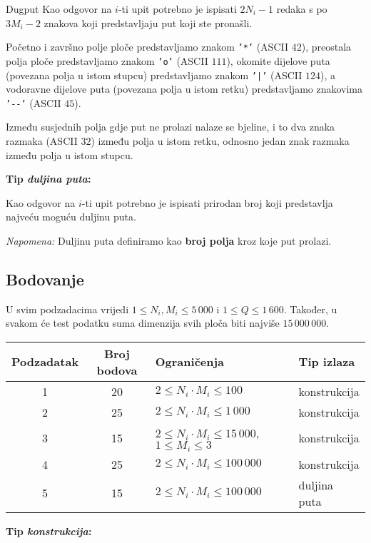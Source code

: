 \begin{statement}[
  problempoints=100,
  timelimit=5 sekundi,
  memorylimit=512 MiB,
]{Dugput}
Kao odgovor na $i$-ti upit potrebno je ispisati $2N_i-1$ redaka s po $3M_i-2$
znakova koji predstavljaju put koji ste pronašli.

Početno i završno polje ploče predstavljamo znakom \texttt{'*'} (ASCII $42$),
preostala polja ploče predstavljamo znakom \texttt{'o'} (ASCII $111$),
okomite dijelove puta (povezana polja u istom stupcu) predstavljamo znakom
\texttt{'|'} (ASCII $124$), a vodoravne dijelove puta (povezana polja u istom
retku) predstavljamo znakovima \texttt{'-{}-'} (ASCII $45$).

Između susjednih polja gdje put ne prolazi nalaze se bjeline, i to dva znaka
razmaka (ASCII $32$) između polja u istom retku, odnosno jedan znak razmaka
između polja u istom stupcu.

\textbf{Tip \textit{duljina puta}:}

Kao odgovor na $i$-ti upit potrebno je ispisati prirodan broj koji predstavlja
najveću moguću duljinu puta.

\textit{Napomena:} Duljinu puta definiramo kao \textbf{broj polja} kroz koje put prolazi.

\subsection*{Bodovanje}
U svim podzadacima vrijedi $1 \leq N_i, M_i \leq 5\,000$ i $1 \leq Q \leq 1\,600$.
Također, u svakom će test podatku suma dimenzija svih ploča biti najviše $15\,000\,000$.

{\renewcommand{\arraystretch}{1.4}
  \setlength{\tabcolsep}{6pt}
  \begin{tabular}{ccll}
  Podzadatak & Broj bodova & Ograničenja & Tip izlaza \\ \midrule
  1 & 20 & $2 \leq N_i \cdot M_i \leq 100$ & konstrukcija \\
  2 & 25 & $2 \leq N_i \cdot M_i \leq 1\,000$ & konstrukcija \\
  3 & 15 & $2 \leq N_i \cdot M_i \leq 15\,000$, $1 \leq M_i \leq 3$ & konstrukcija \\
  4 & 25 & $2 \leq N_i \cdot M_i \leq 100\,000$ & konstrukcija \\
  5 & 15 & $2 \leq N_i \cdot M_i \leq 100\,000$ & duljina puta \\
\end{tabular}}

\textbf{Tip \textit{konstrukcija}:}


\end{statement}
